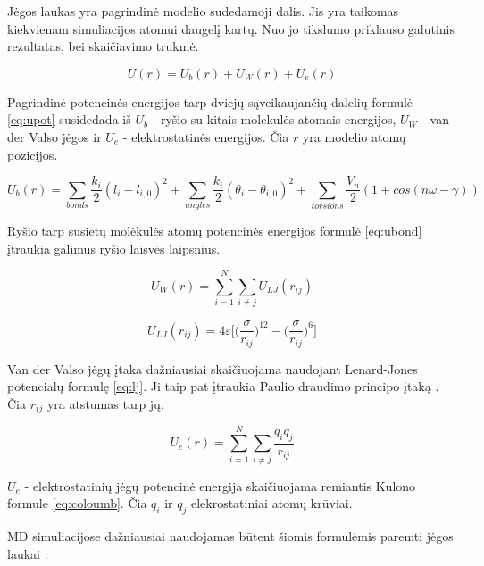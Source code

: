 Jėgos laukas yra pagrindinė modelio sudedamoji dalis.
Jis yra taikomas kiekvienam simuliacijos atomui daugelį kartų.
Nuo jo tikslumo priklauso galutinis rezultatas, bei skaičiavimo trukmė.


\begin{equation} \label{eq:upot}
    U(r) = U_b(r) + U_W(r) + U_e(r)
\end{equation}


Pagrindinė potencinės energijos tarp dviejų sąveikaujančių dalelių formulė \ref{eq:upot} susidedada iš
\(U_b\) - ryšio su kitais molekulės atomais energijos, \(U_W\) - van der Valso jėgos ir \(U_e\) - elektrostatinės  energijos.
Čia \(r\) yra modelio atomų pozicijos.

\begin{equation} \label{eq:ubond}
U_b(r) = \sum\limits_{bonds}{\dfrac {k_i} {2} (l_i - l_{i,0})^2} + \sum\limits_{angles}{\dfrac {k_i} {2} (\theta_i - \theta_{i,0})^2} + \sum\limits_{torsions}{\dfrac {V_n} {2} (1 + cos(n\omega - \gamma))}
\end{equation}

Ryšio tarp susietų molėkulės atomų potencinės energijos formulė \ref{eq:ubond} įtraukia galimus ryšio laisvės laipsnius.


\begin{equation} \label{eq:uw}
U_W(r) = \sum\limits_{i=1}^N \sum\limits_{i\neq j} {U_{LJ}(r_{ij})}
\end{equation}

\begin{equation} \label{eq:lj}
    U_{LJ}(r_{ij}) = 4\varepsilon\Bigg[\bigg(\dfrac \sigma {r_{ij}}\bigg)^{12} - \bigg(\dfrac \sigma {r_{ij}}\bigg)^6\Bigg]
\end{equation}

Van der Valso jėgų įtaka dažniausiai skaičiuojama naudojant Lenard-Jones potencialų formulę \ref{eq:lj}.
Ji taip pat įtraukia Paulio draudimo principo įtaką \cite{molmod}.
Čia \(r_{ij}\) yra atstumas tarp jų.

\begin{equation} \label{eq:coloumb}
    U_{e}(r) = \sum\limits_{i=1}^N \sum\limits_{i\neq j} {\dfrac{q_i q_j}{r_{ij}}}
\end{equation}

\(U_e\) - elektrostatinių jėgų potencinė energija skaičiuojama remiantis Kulono formule \ref{eq:coloumb}.
Čia \(q_i\) ir \(q_j\) elekrostatiniai atomų krūviai.

MD simuliacijose dažniausiai naudojamas būtent šiomis formulėmis paremti jėgos laukai \cite{polar}.

